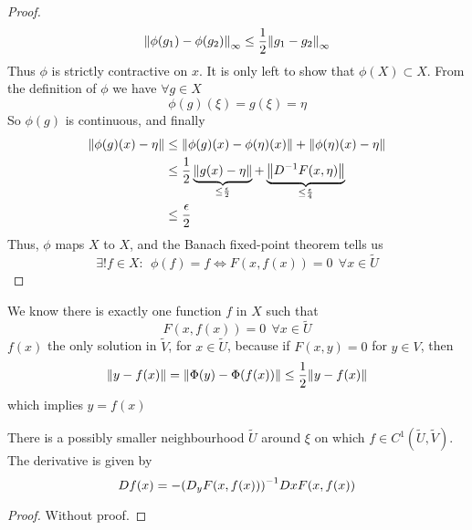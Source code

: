 \documentclass[../../script.tex]{subfiles}
\begin{document}
\begin{proof}
    \begin{equation}
        \norm{\phi(g_1) - \phi(g_2)}_{\infty} \le \frac{1}{2} \norm{g_1 - g_2}_{\infty}
    \end{equation}
    Thus $\phi$ is strictly contractive on $x$. It is only left to show that $\phi(X) \subset X$.
    From the definition of $\phi$ we have $\forall g \in X$
    \begin{equation}
        \phi(g)(\xi) = g(\xi) = \eta
    \end{equation}
    So $\phi(g)$ is continuous, and finally 
    \begin{equation}
        \begin{split}
            \norm{\phi(g)(x) - \eta} &\le \norm{\phi(g)(x) - \phi(\eta)(x)} + \norm{\phi(\eta)(x) - \eta} \\
            &\le \frac{1}{2} \underbrace{\norm{g(x) - \eta}}_{\le \frac{\epsilon}{2}} + \underbrace{\norm{{D}^{-1}F(x, \eta)}}_{\le \frac{\epsilon}{4}} \\
            &\le \frac{\epsilon}{2}
        \end{split}
    \end{equation}
    Thus, $\phi$ maps $X$ to $X$, and the Banach fixed-point theorem tells us 
    \begin{equation}
        \exists! f \in X: ~~\phi(f) = f \iff F(x, f(x)) = 0 ~~\forall x \in \tilde{U}
    \end{equation}
\end{proof}

\begin{rem}
    We know there is exactly one function $f$ in $X$ such that 
    \[
        F(x, f(x)) = 0 ~~\forall x \in \tilde{U}
    \]
    $f(x)$ the only solution in $\tilde{V}$, for $x \in \tilde{U}$, because if $F(x, y) = 0$ for $y \in V$, then 
    \[
        \norm{y - f(x)} = \norm{\Phi(y) - \Phi(f(x))} \le \frac{1}{2} \norm{y - f(x)}
    \]
    which implies $y = f(x)$
\end{rem}

\begin{thm}
    There is a possibly smaller neighbourhood $\tilde{U}$ around $\xi$ on which $f \in C^1(\tilde{U}, \tilde{V})$. The derivative is given by 
    \[
        D f(x) = -{\left( D_y F(x, f(x)) \right)}^{-1} Dx F(x, f(x))
    \]
\end{thm}
\begin{proof}
    Without proof.
\end{proof}
\end{document}
